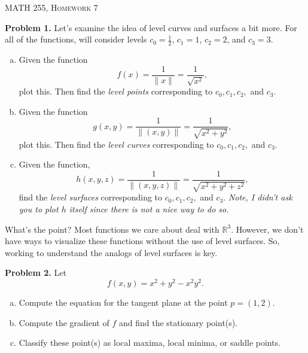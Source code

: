 \documentclass[12pt]{report} %
\newcommand{\R}{\mathbb{R}}
\theoremstyle{definition}
\begin{document}
\begin{center}
   \textsc{\large MATH 255, Homework 7}\\
\end{center}
\vspace{.5cm}

\noindent\textbf{Problem 1.} Let's examine the idea of level curves and surfaces a bit more.  For all of the functions, will consider levels $c_0 = \frac{1}{2}$, $c_1=1$, $c_2=2$, and $c_3=3$.  
\begin{enumerate}[(a)]
    \item Given the function
    \[
    f(x)=\frac{1}{\|x\|}=\frac{1}{\sqrt{x^2}},
    \]
    plot this.  Then find the \emph{level points} corresponding to $c_0,c_1,c_2,$ and $c_3$.
    \item Given the function
    \[
    g(x,y) = \frac{1}{\|(x,y)\|}=\frac{1}{\sqrt{x^2+y^2}},
    \]
    plot this.  Then find the \emph{level curves} corresponding to $c_0,c_1,c_2,$ and $c_3$.
    \item Given the function,
    \[
    h(x,y,z) = \frac{1}{\|(x,y,z)\|}=\frac{1}{\sqrt{x^2+y^2+z^2}},
    \]
    find the \emph{level surfaces} corresponding to $c_0,c_1,c_2,$ and $c_3$. 
    \emph{Note, I didn't ask you to plot $h$ itself since there is not a nice way to do so.}
\end{enumerate}
What's the point? Most functions we care about deal with $\R^3$.  However, we don't have ways to visualize these functions without the use of level surfaces.  So, working to understand the analogs of level surfaces is key.
\vspace*{.5cm}


\noindent\textbf{Problem 2.} Let
\[
f(x,y) = x^2+y^2-x^2y^2.
\]
\begin{enumerate}[(a)]
    \item Compute the equation for the tangent plane at the point $p=(1,2)$.
    \item Compute the gradient of $f$ and find the stationary point(s).
    \item Classify these point(s) as local maxima, local minima, or saddle points.
\end{enumerate}
\vspace*{.5cm}
\end{document}
